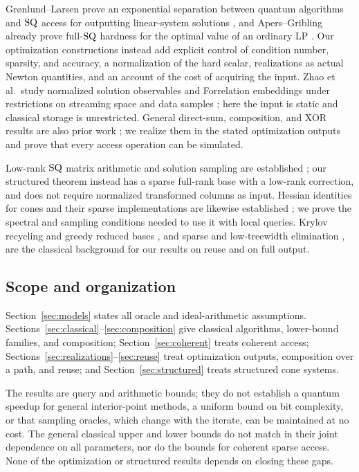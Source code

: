 Gr\o nlund--Larsen prove an exponential separation between quantum
algorithms and $\mathrm{SQ}$ access for outputting linear-system solutions
\citep{GronlundLarsen2025}, and Apers--Gribling already prove full-$\mathrm{SQ}$
hardness for the optimal value of an ordinary LP
\citep[Lemma 8.5]{ApersGribling2026}. Our optimization constructions instead
add explicit control of condition number, sparsity, and accuracy, a
normalization of the hard scalar, realizations as actual Newton
quantities, and an account of the cost of acquiring the input. Zhao et al.\ study normalized solution
observables and Forrelation embeddings under restrictions on streaming
space and data samples \citep[Task F.1 and Sections E.5--F]{ZhaoEtAl2026};
here the input is static and classical storage is unrestricted. General
direct-sum, composition, and XOR results are also prior work
\citep{BlaisBrody2019,BenDavidBlais2020,ChakrabortyEtAl2023,BrodyEtAl2023};
we realize them in the stated optimization outputs and prove that every
access operation can be simulated.

Low-rank $\mathrm{SQ}$ matrix arithmetic and solution sampling are established
\citep{ChiaEtAl2022}; our structured theorem instead has a sparse
full-rank base with a low-rank correction, and does not require normalized
transformed columns as input. Hessian identities for cones and their
sparse implementations are likewise established
\citep{AlizadehGoldfarb2003,GoldfarbScheinberg2005,
RoyXiao2022,ChenGoulart2025,KapelevichAndersenVielma2024};
we prove the spectral and sampling conditions needed to use it with
local queries. Krylov recycling and greedy reduced
bases \citep{ParksEtAl2006,BinevEtAl2011}, and sparse and low-treewidth
elimination \citep{Vanderbei1995,FurerHoppenTrevisan2025}, are the
classical background for our results on reuse and on full output.

\subsection{Scope and organization}
Section~\ref{sec:models} states all oracle and ideal-arithmetic
assumptions. Sections~\ref{sec:classical}--\ref{sec:composition} give
classical algorithms, lower-bound families, and composition;
Section~\ref{sec:coherent} treats coherent access;
Sections~\ref{sec:realizations}--\ref{sec:reuse} treat optimization
outputs, composition over a path, and reuse; and
Section~\ref{sec:structured} treats structured cone systems.

The results are query and arithmetic bounds; they do not establish a quantum speedup for general interior-point
methods, a uniform bound on bit complexity, or that sampling oracles,
which change with the iterate, can be maintained at no cost. The general
classical upper and lower bounds do not match in their joint dependence
on all parameters, nor do the bounds for coherent sparse access. None of the optimization or structured results depends on
closing these gaps.
